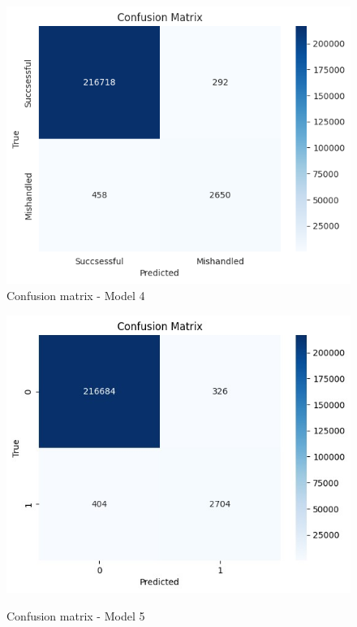 \documentclass[12pt]{article}
\begin{document}
\begin{figure}
\break
\begin{minipage}[c]{0.45\linewidth}
    \includegraphics[width=1\textwidth]{Confusion_matrix_Model 4.png}\\
    \caption{Confusion matrix - Model 4}
\end{minipage}%
\hfill
\begin{minipage}[c]{0.45\linewidth}
\includegraphics[width=1\textwidth]{Confusion_matrix_Model 5.jpg}\\
\caption{Confusion matrix - Model 5}
\end{minipage}
\break
\begin{minipage}[c]{0.45\linewidth}

\end{minipage}
\end{figure}
\end{document}
